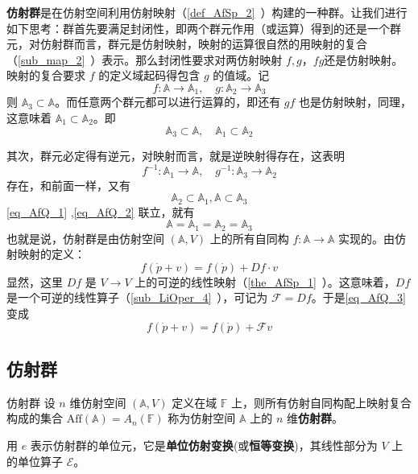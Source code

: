 
\textbf{仿射群}是在仿射空间利用仿射映射（\autoref{def_AfSp_2}~）构建的一种群。让我们进行如下思考：群首先要满足封闭性，即两个群元作用（或运算）得到的还是一个群元，对仿射群而言，群元是仿射映射，映射的运算很自然的用映射的复合（\autoref{sub_map_2}~）表示。那么封闭性要求对两仿射映射 $f,g$，$fg$还是仿射映射。映射的复合要求 $f$ 的定义域起码得包含 $g$ 的值域。记
 \begin{equation}
f:\mathbb A\rightarrow\mathbb A_1,\quad g:\mathbb A_2\rightarrow \mathbb A_3
 \end{equation}
 则 $\mathbb A_3\subset \mathbb A$。而任意两个群元都可以进行运算的，即还有 $gf$ 也是仿射映射，同理，这意味着 $\mathbb A_1\subset\mathbb A_2$。即
 \begin{equation}\label{eq_AfQ_1}
 \mathbb A_3\subset \mathbb A,\quad \mathbb A_1\subset\mathbb A_2
 \end{equation}
 
 其次，群元必定得有逆元，对映射而言，就是逆映射得存在，这表明
\begin{equation}
 f^{-1}:\mathbb A_1\rightarrow\mathbb A,\quad g^{-1}:\mathbb A_3\rightarrow\mathbb A_2
\end{equation}
 存在，和前面一样，又有
 \begin{equation}\label{eq_AfQ_2}
 \mathbb A_2\subset \mathbb A_1, \mathbb A\subset\mathbb A_3
 \end{equation}
 \autoref{eq_AfQ_1} ,\autoref{eq_AfQ_2} 联立，就有
 \begin{equation}
 \mathbb A=\mathbb A_1= \mathbb A_2=\mathbb A_3
 \end{equation}
 也就是说，仿射群是由仿射空间 $(\mathbb A,V)$ 上的所有自同构 $f:\mathbb A\rightarrow\mathbb A$ 实现的。由仿射映射的定义：
 \begin{equation}\label{eq_AfQ_3}
 f(\dot p+v)=f(\dot p)+Df\cdot v
 \end{equation}
 显然，这里 $Df$ 是 $V\rightarrow V$ 上的可逆的线性映射（\autoref{the_AfSp_1}~）。这意味着，$Df$ 是一个可逆的线性算子（\autoref{sub_LiOper_4}~），可记为 $\mathcal F=Df$。于是\autoref{eq_AfQ_3} 变成
 \begin{equation}
 f(\dot p+v)=f(\dot p)+\mathcal F v
 \end{equation}
 \subsection{仿射群}
 \begin{definition}{仿射群}
 设 $n$ 维仿射空间 $(\mathbb A,V)$ 定义在域 $\mathbb F$ 上，则所有仿射自同构配上映射复合构成的集合 $\mathrm{Aff}(\mathbb A)=A_n(\mathbb F)$ 称为仿射空间 $\mathbb A$ 上的 $n$ 维\textbf{仿射群}。
 \end{definition}
 用 $e$ 表示仿射群的单位元，它是\textbf{单位仿射变换}(或\textbf{恒等变换})，其线性部分为 $V$ 上的单位算子 $\mathcal E$。

